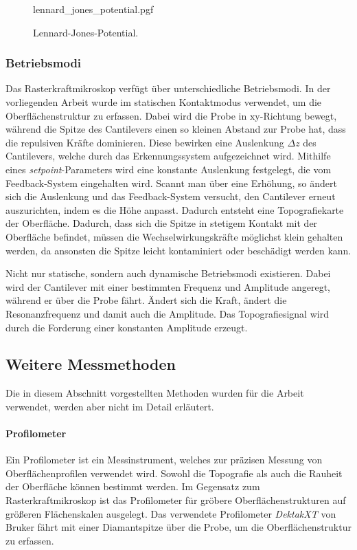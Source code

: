 \begin{figure}
    \centering
    {lennard_jones_potential.pgf}
    \caption{Lennard-Jones-Potential.}
    \label{fig:afm_aufbau}
\end{figure}


\subsubsection{Betriebsmodi}
Das Rasterkraftmikroskop verfügt über unterschiedliche Betriebsmodi.
In der vorliegenden Arbeit wurde im statischen Kontaktmodus verwendet, um die Oberflächenstruktur zu erfassen.
Dabei wird die Probe in $\mathrm{xy}$-Richtung bewegt, während die Spitze des Cantilevers einen so kleinen Abstand zur
Probe hat, dass die repulsiven Kräfte dominieren.
Diese bewirken eine Auslenkung $\Delta z$ des Cantilevers, welche durch das Erkennungssystem aufgezeichnet wird.
Mithilfe eines \textit{setpoint}-Parameters wird eine konstante Auslenkung festgelegt, die vom Feedback-System
eingehalten wird.
Scannt man über eine Erhöhung, so ändert sich die Auslenkung und das Feedback-System versucht, den Cantilever erneut
auszurichten, indem es die Höhe anpasst.
Dadurch entsteht eine Topografiekarte der Oberfläche.
Dadurch, dass sich die Spitze in stetigem Kontakt mit der Oberfläche befindet, müssen die Wechselwirkungskräfte
möglichst klein gehalten werden,
da ansonsten die Spitze leicht kontaminiert oder beschädigt werden kann.\autocite[199-201]{afm-buch}

Nicht nur statische, sondern auch dynamische Betriebsmodi existieren.
Dabei wird der Cantilever mit einer bestimmten Frequenz und Amplitude angeregt, während er über die Probe fährt.
Ändert sich die Kraft, ändert die Resonanzfrequenz und damit auch die Amplitude.
Das Topografiesignal wird durch die Forderung einer konstanten Amplitude erzeugt.\autocite[209]{afm-buch}

\subsection{Weitere Messmethoden}\label{subsec:weitere-messmethoden}
Die in diesem Abschnitt vorgestellten Methoden wurden für die Arbeit verwendet, werden aber
nicht im Detail erläutert.

\paragraph{Profilometer}
Ein Profilometer ist ein Messinstrument, welches zur präzisen Messung von Oberflächenprofilen verwendet wird.
Sowohl die Topografie als auch die Rauheit der Oberfläche können bestimmt werden.
Im Gegensatz zum Rasterkraftmikroskop ist das Profilometer für gröbere Oberflächenstrukturen auf größeren Flächenskalen
ausgelegt.
Das verwendete Profilometer \textit{DektakXT} von Bruker fährt mit einer Diamantspitze über die Probe, um
die Oberflächenstruktur zu erfassen.

